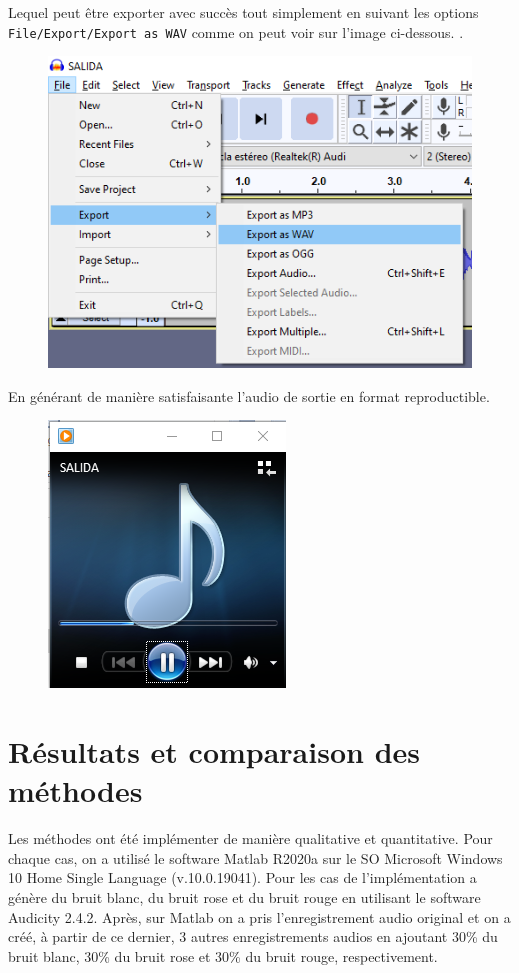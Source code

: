 \documentclass[conference,onecolumn]{IEEEtran}
\begin{document}
Lequel peut être exporter avec succès tout simplement en suivant les options \texttt{File/Export/Export as WAV} comme on peut voir sur l’image ci-dessous. 
.
 \begin{figure}[H]
 \centering
    \includegraphics[scale=0.4]{VM11.png}
\end{figure}

En générant de manière satisfaisante l’audio de sortie en format reproductible.
 \begin{figure}[H]
 \centering
    \includegraphics[scale=0.5]{VM12.png}
\end{figure}


\newpage
\section{Résultats et comparaison des méthodes}
Les méthodes ont été implémenter de manière qualitative et quantitative. Pour chaque cas, on a utilisé le software Matlab R2020a sur le SO Microsoft Windows 10 Home Single Language (v.10.0.19041). Pour les cas de l’implémentation a génère du bruit blanc, du bruit rose et du bruit rouge en utilisant le software Audicity 2.4.2. Après, sur Matlab on a pris l’enregistrement audio original et on a créé, à partir de ce dernier, 3 autres enregistrements audios en ajoutant 30\% du bruit blanc, 30\% du bruit rose et 30\% du bruit rouge, respectivement.
\end{document}
